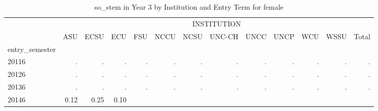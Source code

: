 \begin{table}[!h]
\caption{so\_stem in Year 3 by Institution and Entry Term for female}
\centering
\begin{tabular}{lllllllllllll}
\cline{1-13}
\multicolumn{1}{c}{} &
  \multicolumn{12}{|c}{INSTITUTION} \\
\multicolumn{1}{c}{} &
  \multicolumn{1}{|r}{ASU} &
  \multicolumn{1}{r}{ECSU} &
  \multicolumn{1}{r}{ECU} &
  \multicolumn{1}{r}{FSU} &
  \multicolumn{1}{r}{NCCU} &
  \multicolumn{1}{r}{NCSU} &
  \multicolumn{1}{r}{UNC-CH} &
  \multicolumn{1}{r}{UNCC} &
  \multicolumn{1}{r}{UNCP} &
  \multicolumn{1}{r}{WCU} &
  \multicolumn{1}{r}{WSSU} &
  \multicolumn{1}{r}{Total} \\
\cline{1-13}
\multicolumn{1}{l}{entry\_semester} &
  \multicolumn{1}{|r}{} &
  \multicolumn{1}{r}{} &
  \multicolumn{1}{r}{} &
  \multicolumn{1}{r}{} &
  \multicolumn{1}{r}{} &
  \multicolumn{1}{r}{} &
  \multicolumn{1}{r}{} &
  \multicolumn{1}{r}{} &
  \multicolumn{1}{r}{} &
  \multicolumn{1}{r}{} &
  \multicolumn{1}{r}{} &
  \multicolumn{1}{r}{} \\
\multicolumn{1}{l}{\hspace{1em}20116} &
  \multicolumn{1}{|r}{.} &
  \multicolumn{1}{r}{.} &
  \multicolumn{1}{r}{.} &
  \multicolumn{1}{r}{.} &
  \multicolumn{1}{r}{.} &
  \multicolumn{1}{r}{.} &
  \multicolumn{1}{r}{.} &
  \multicolumn{1}{r}{.} &
  \multicolumn{1}{r}{.} &
  \multicolumn{1}{r}{.} &
  \multicolumn{1}{r}{.} &
  \multicolumn{1}{r}{.} \\
\multicolumn{1}{l}{\hspace{1em}20126} &
  \multicolumn{1}{|r}{.} &
  \multicolumn{1}{r}{.} &
  \multicolumn{1}{r}{.} &
  \multicolumn{1}{r}{.} &
  \multicolumn{1}{r}{.} &
  \multicolumn{1}{r}{.} &
  \multicolumn{1}{r}{.} &
  \multicolumn{1}{r}{.} &
  \multicolumn{1}{r}{.} &
  \multicolumn{1}{r}{.} &
  \multicolumn{1}{r}{.} &
  \multicolumn{1}{r}{.} \\
\multicolumn{1}{l}{\hspace{1em}20136} &
  \multicolumn{1}{|r}{.} &
  \multicolumn{1}{r}{.} &
  \multicolumn{1}{r}{.} &
  \multicolumn{1}{r}{.} &
  \multicolumn{1}{r}{.} &
  \multicolumn{1}{r}{.} &
  \multicolumn{1}{r}{.} &
  \multicolumn{1}{r}{.} &
  \multicolumn{1}{r}{.} &
  \multicolumn{1}{r}{.} &
  \multicolumn{1}{r}{.} &
  \multicolumn{1}{r}{.} \\
\multicolumn{1}{l}{\hspace{1em}20146} &
  \multicolumn{1}{|r}{0.12} &
  \multicolumn{1}{r}{0.25} &
  \multicolumn{1}{r}{0.10} &

\end{tabular}
\end{table}
